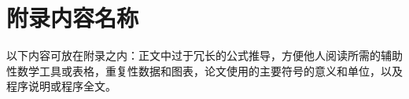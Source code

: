 
\chapter{附录内容名称}

以下内容可放在附录之内：正文中过于冗长的公式推导，方便他人阅读所需的辅助性数学工具或表格，重复性数据和图表，论文使用的主要符号的意义和单位，以及程序说明或程序全文。
